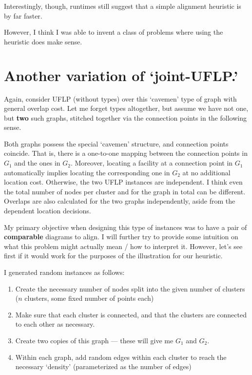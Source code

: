 \documentclass[11pt]{article}
\begin{document}
Interestingly, though, runtimes still suggest that a simple alignment heuristic
is by far faster.

However, I think I was able to invent a class of problems where using the
heuristic does make sense.

\section{Another variation of `joint-UFLP.'}
\label{sec:org6612cc6}
Again, consider UFLP (without types) over this ‘cavemen’ type of graph with
general overlap cost. Let me forget types altogether, but assume we have not
one, but \textbf{two} such graphs, stitched together via the connection points in the
following sense.

Both graphs possess the special ‘cavemen’ structure, and connection points
coincide. That is, there is a one-to-one mapping between the connection points
in \(G_1\) and the ones in \(G_2\). Moreover, locating a facility at a connection
point in \(G_1\) automatically implies locating the corresponding one in \(G_2\) at
no additional location cost. Otherwise, the two UFLP instances are independent.
I think even the total number of nodes per cluster and for the graph in total
can be different. Overlaps are also calculated for the two graphs independently,
aside from the dependent location decisions.

My primary objective when designing this type of instances was to have a pair of
\textbf{comparable} diagrams to align. I will further try to provide some intuition on
what this problem might actually mean / how to interpret it. However, let’s see
first if it would work for the purposes of the illustration for our heuristic.

I generated random instances as follows:
\begin{enumerate}
\item Create the necessary number of nodes split into the given number of clusters (\(n\) clusters, some fixed number of points each)
\item Make sure that each cluster is connected, and that the clusters are connected to each other as necessary.
\item Create two copies of this graph — these will give me \(G_1\) and \(G_2\).
\item Within each graph, add random edges within each cluster to reach the necessary ‘density’ (parameterized as the number of edges)
\end{enumerate}
\end{document}
